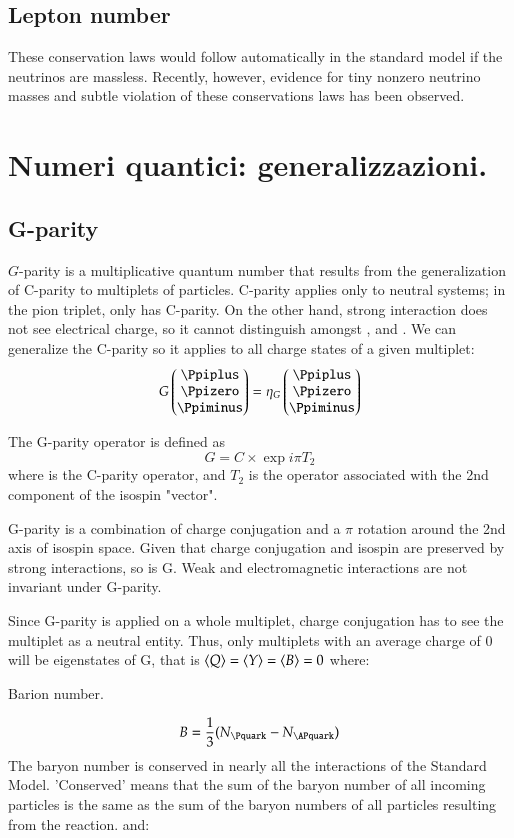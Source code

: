 \documentclass[main.tex]{subfiles}
\begin{document}
\subsection{Lepton number}
These conservation laws would follow automatically in the standard model if the neutrinos are massless. Recently, however, evidence for tiny nonzero neutrino masses and subtle violation of these conservations laws has been observed.

\section{Numeri quantici: generalizzazioni.}

\subsection{G-parity}
$G$-parity is a multiplicative quantum number that results from the generalization of C-parity to multiplets of particles. 
C-parity applies only to neutral systems; in the pion triplet, only \Ppizero has C-parity. On the other hand, strong interaction does not see electrical charge, so it cannot distinguish amongst \Ppiplus, \Ppizero and \Ppiminus. We can generalize the C-parity so it applies to all charge states of a given multiplet:
\begin{equation*}
G\threesv{\Ppiplus}{\Ppizero}{\Ppiminus}=\eta_G\threesv{\Ppiplus}{\Ppizero}{\Ppiminus}
\end{equation*}

The G-parity operator is defined as
\begin{equation*}
G=C\times\exp{i\pi T_2}
\end{equation*}
where  is the C-parity operator, and $T_2$ is the operator associated with the 2nd component of the isospin "vector".

G-parity is a combination of charge conjugation and a $\pi$ rotation around the 2nd axis of isospin space. Given that charge conjugation and isospin are preserved by strong interactions, so is G. Weak and electromagnetic interactions are not invariant under G-parity.

Since G-parity is applied on a whole multiplet, charge conjugation has to see the multiplet as a neutral entity. Thus, only multiplets with an average charge of 0 will be eigenstates of G, that is
$\langle Q \rangle=\langle Y \rangle=\langle B \rangle=0$ where:

Barion number.

\begin{equation*}
B=\frac{1}{3}(N_{\Pquark}-N_{\APquark})
\end{equation*}
The baryon number is conserved in nearly all the interactions of the Standard Model. 'Conserved' means that the sum of the baryon number of all incoming particles is the same as the sum of the baryon numbers of all particles resulting from the reaction.
and:
\end{document}
